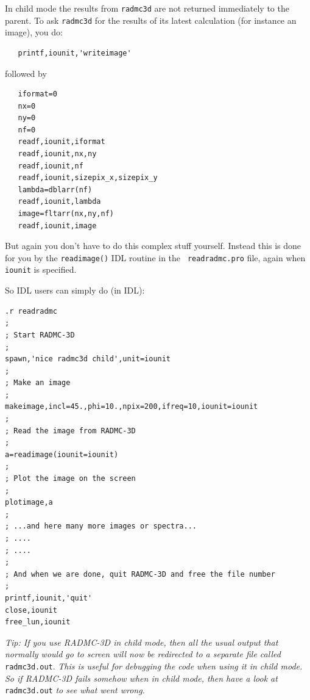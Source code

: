 \documentclass{report}
\newenvironment{asciibox}%
  {\begin{list}{}{%
    \setlength{\topsep}{0.5em}%
    \setlength{\parskip}{0em}%
    \setlength{\parsep}{0em}%
    \setlength{\itemsep}{0em}%
    \setlength{\rightmargin}{0em}%
    \setlength{\leftmargin}{3.0em}%
    \setlength{\labelsep}{1em}%
    \setlength{\labelwidth}{2em}%
  }\normalfont\footnotesize\item}
  {\end{list}}
\begin{document}
In child mode the results from {\small\tt radmc3d} are not returned
immediately to the parent. To ask {\small\tt radmc3d} for the results of its
latest calculation (for instance an image), you do:
\begin{asciibox}\begin{verbatim}
   printf,iounit,'writeimage'
\end{verbatim}\end{asciibox}
followed by
\begin{asciibox}\begin{verbatim}
   iformat=0
   nx=0
   ny=0
   nf=0
   readf,iounit,iformat
   readf,iounit,nx,ny
   readf,iounit,nf
   readf,iounit,sizepix_x,sizepix_y
   lambda=dblarr(nf)
   readf,iounit,lambda
   image=fltarr(nx,ny,nf)
   readf,iounit,image
\end{verbatim}\end{asciibox}
But again you don't have to do this complex stuff yourself. Instead this is
done for you by the {\small\tt readimage()} IDL routine in the {\small\tt
  readradmc.pro} file, again when {\small\tt iounit} is specified.

So IDL users can simply do (in IDL):
\begin{asciibox}\begin{verbatim}
.r readradmc
;
; Start RADMC-3D
;
spawn,'nice radmc3d child',unit=iounit
;
; Make an image
;
makeimage,incl=45.,phi=10.,npix=200,ifreq=10,iounit=iounit
;
; Read the image from RADMC-3D
;
a=readimage(iounit=iounit)
;
; Plot the image on the screen
;
plotimage,a
;
; ...and here many more images or spectra...
; ....
; ....
;
; And when we are done, quit RADMC-3D and free the file number
;
printf,iounit,'quit'
close,iounit
free_lun,iounit
\end{verbatim}\end{asciibox}

{\em Tip: If you use RADMC-3D in child mode, then all the usual output that
  normally would go to screen will now be redirected to a separate file
  called} {\small\tt radmc3d.out}. {\em This is useful for debugging the code
  when using it in child mode. So if RADMC-3D fails somehow when in child
  mode, then have a look at} {\small\tt radmc3d.out} {\em to see what went
  wrong.}






\end{document}
